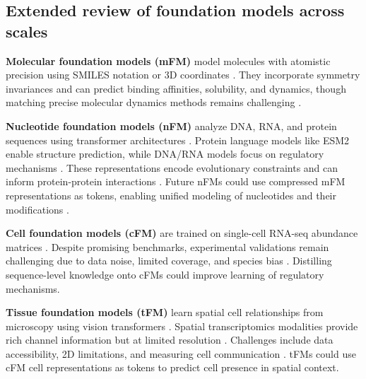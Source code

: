 \subsection{Extended review of foundation models across scales}
\label{sec:foundation_models_detail}
\textbf{Molecular foundation models (mFM)} model molecules with atomistic precision using \gls{SMILES} notation or 3D coordinates \citep{abramsonAccurateStructurePrediction2024, mendez-lucioMolEFoundationModel2024, rossLargescaleChemicalLanguage2022}. They incorporate symmetry invariances \citep{batznerE3equivariantGraphNeural2022} and can predict binding affinities, solubility, and dynamics, though matching precise molecular dynamics methods remains challenging \citep{benali2025pushingaccuracylimitfoundation, rhodes2025orbv3atomisticsimulationscale}.

\textbf{Nucleotide foundation models (nFM)} analyze \gls{DNA}, \gls{RNA}, and protein sequences using transformer architectures \citep{vaswaniAttentionAllYou2023, nguyen2023hyenadnalongrangegenomicsequence}. Protein language models like \gls{ESM}2 \citep{esm2} enable structure prediction, while \gls{DNA}/\gls{RNA} models focus on regulatory mechanisms \citep{dalla-torreNucleotideTransformerBuilding2024, wangMultipurposeRNALanguage2024, brixiGenomeModelingDesign2025}. These representations encode evolutionary constraints and can inform protein-protein interactions \citep{cornmanOMGDatasetOpen2024a}. Future \gls{nFM}s could use compressed \gls{mFM} representations as tokens, enabling unified modeling of nucleotides and their modifications \citep{xiaNatureLMDecipheringLanguage2025}.

\textbf{Cell foundation models (cFM)} are trained on single-cell RNA-seq abundance matrices \citep{bunneHowBuildVirtual2024, scprint, theodorisTransferLearningEnables2023, cuiScGPTBuildingFoundation2024, haoLargescaleFoundationModel2024, rosenUniversalCellEmbeddings2023}. Despite promising benchmarks, experimental validations remain challenging due to data noise, limited coverage, and species bias \citep{bendidiBenchmarkingTranscriptomicsFoundation2024, boiarskyDeepDiveSingleCell2023, programCZCELLxGENEDiscover2023}. Distilling sequence-level knowledge onto cFMs could improve learning of regulatory mechanisms.

\textbf{Tissue foundation models (tFM)} learn spatial cell relationships from microscopy using vision transformers \citep{oquabDINOv2LearningRobust2024, chief, brayCellPaintingHighcontent2016, wencksternAIpoweredVirtualTissues2025}. Spatial transcriptomics modalities provide rich channel information but at limited resolution \citep{alonExpansionSequencingSpatially2021}. Challenges include data accessibility, 2D limitations, and measuring cell communication \citep{hertleHorizontalGenomeTransfer2021}. tFMs could use \gls{cFM} cell representations as tokens to predict cell presence in spatial context.

